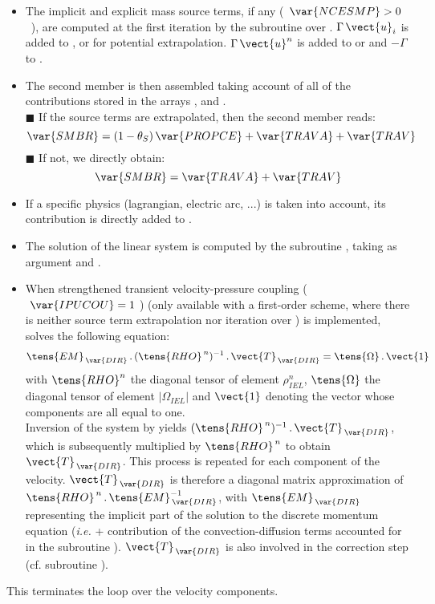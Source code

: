 \begin{itemize}
\item The implicit and explicit mass source terms, if any (~$\var{NCESMP}>0$~), are computed at the first iteration by the subroutine   over . $\Gamma\,\vect{u}_i$ is added to ,  or  for potential extrapolation. $\Gamma\,\vect{u}^n$ is added to  or  and
$-\Gamma$ to .
\\
\item The second member is then assembled taking account of all of the
contributions stored in the arrays ,  and
.\\
{\tiny$\blacksquare$} If the source terms are extrapolated, then the second member reads:
$$\var{SMBR}=(1-\theta_S)\,\var{PROPCE}+\var{TRAVA}+\var{TRAV}$$
{\tiny$\blacksquare$} If not, we directly obtain:
$$\var{SMBR}=\var{TRAVA}+\var{TRAV}$$

\item If a specific physics (lagrangian, electric arc, ...) is taken into account, its contribution is directly added to .
\\
\item The solution of the linear system is computed by the subroutine
, taking as argument  and .\\

\item When strengthened transient velocity-pressure coupling ($\ \var{IPUCOU} = 1\ $) (only available with a first-order scheme, where there is neither source term extrapolation nor iteration over ) is implemented,  solves the following equation:
\begin{equation}\label{Base_Predvv_Eq_Tdir}
\tens{EM}_{\,\var{DIR}}\,.\, (\tens{RHO}^{\,n})^{-1}\,.\,\vect{T}_{\,\var{DIR}} =
\tens{\Omega}\,.\,\vect{1}
\end{equation}
with $\tens{RHO}^n$ the diagonal tensor of element $\rho^{n}_{IEL}$,
$\tens{\Omega}$ the diagonal tensor of element $|\Omega_{IEL}|$ and $\vect{1}$ denoting the
vector whose components are all equal to one.\\
Inversion of the system by  yields
$(\tens{RHO}^{\,n})^{-1}\,.\,\vect{T}_{\,\var{DIR}}$, which is subsequently multiplied by $\tens{RHO}^{\,n}$
to obtain $\vect{T}_{\,\var{DIR}}$.
This process is repeated for each component  of the velocity. $\vect{T}_{\,\var{DIR}}$
is therefore a diagonal matrix approximation of
$\tens{RHO}^{\,n}\,.\,\tens{EM}_{\,\var{DIR}}^{-1}$, with
$\tens{EM}_{\,\var{DIR}}$ representing the implicit part of the solution to the discrete momentum equation (\emph{i.e.}  + contribution of the convection-diffusion terms accounted for in the subroutine
). $\vect{T}_{\,\var{DIR}}$ is also involved in the correction step (cf. subroutine ).\\
\end{itemize}
This terminates the loop over the velocity components.\\

